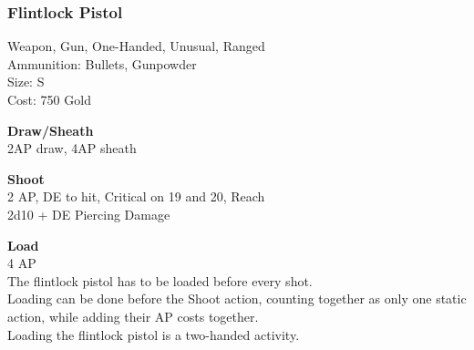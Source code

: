 \subsubsection{Flintlock Pistol}\label{weapon:flintlockPistol}
Weapon, Gun, One-Handed, Unusual, Ranged\\
Ammunition: Bullets, Gunpowder\\
Size: S\\
Cost: 750 Gold

\textbf{Draw/Sheath} \\
2AP draw, 4AP sheath

\textbf{Shoot} \\
2 AP, DE to hit, Critical on 19 and 20,  Reach\\
2d10 + DE Piercing Damage

\textbf{Load} \\
4 AP\\
The flintlock pistol has to be loaded before every shot.\\
Loading can be done before the Shoot action, counting together as only one static action, while adding their AP costs together.\\
Loading the flintlock pistol is a two-handed activity.
